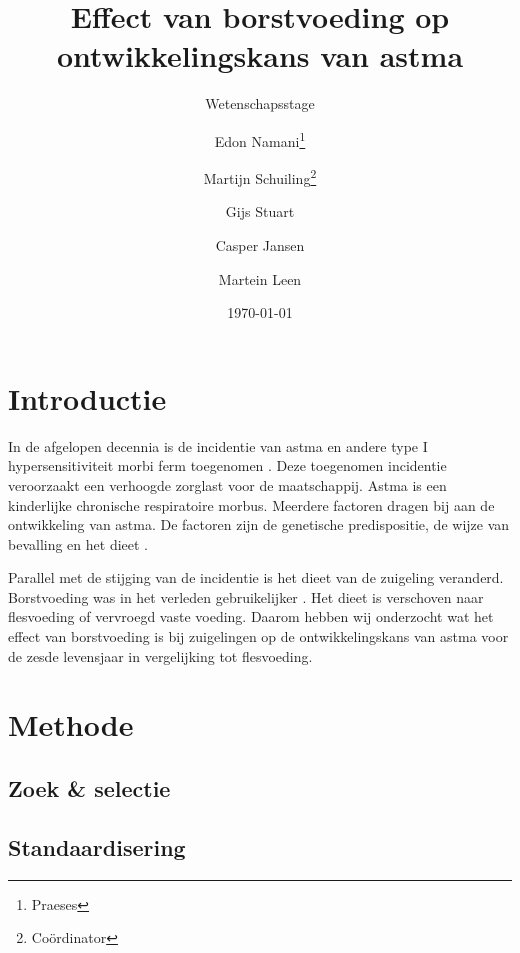 \documentclass[abstract=true]{scrartcl}
\title{Effect van borstvoeding op ontwikkelingskans van astma}
\subtitle{Wetenschapsstage}
\author{Edon Namani\thanks{Praeses} \and Martijn Schuiling\thanks{Co\"ordinator} \and Gijs Stuart \and Casper Jansen \and Martein Leen}
\date{\today}
\begin{document}
\maketitle
    \begin{abstract}

    \end{abstract}

\section{Introductie}
In de afgelopen decennia is de incidentie van astma en andere type I hypersensitiviteit morbi ferm toegenomen \cite{Platts_Mills_2015}. Deze toegenomen incidentie veroorzaakt een verhoogde zorglast voor de maatschappij. Astma is een kinderlijke chronische respiratoire morbus. Meerdere factoren dragen bij aan de ontwikkeling van astma. De factoren zijn de genetische predispositie, de wijze van bevalling en het dieet \cite{abbas2017cellular,Houghteling_2015}.

Parallel met de stijging van de incidentie is het dieet van de zuigeling veranderd. Borstvoeding was in het verleden gebruikelijker \cite{world1981contemporary,Victora_2016,Rollins_2016}. Het dieet is verschoven naar flesvoeding of vervroegd vaste voeding. Daarom hebben wij onderzocht wat het effect van borstvoeding is bij zuigelingen op de ontwikkelingskans van astma voor de zesde levensjaar in vergelijking tot flesvoeding.


\section{Methode}
    \subsection{Zoek \& selectie}

    \subsection{Standaardisering}

\end{document}
